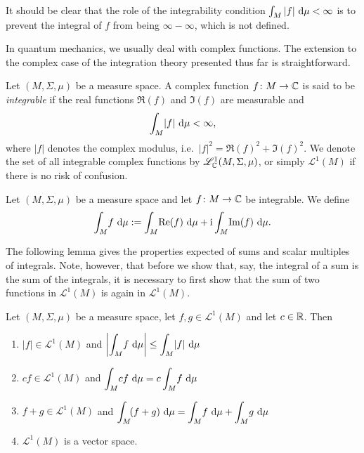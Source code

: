It should be clear that the role of the integrability condition $\int_M |f|\, \mathop{}\!\mathrm{d} \mu<\infty$ is to prevent the integral of $f$ from being $\infty-\infty$, which is not defined.

In quantum mechanics, we usually deal with complex functions. The extension to the complex case of the integration theory presented thus far is straightforward.

\begin{definition}
Let $(M,\Sigma,\mu)$ be a measure space. A complex function $f\colon M\to\mathbb{C}$ is said to be \emph{integrable} if the real functions $\Re(f)$ and $\Im(f)$ are measurable and
\begin{equation*}
\int_{M}\!|f|\,\mathop{}\!\mathrm{d} \mu < \infty,
\end{equation*}
where $|f|$ denotes the complex modulus, i.e.\ $|f|^2=\Re(f)^2+\Im(f)^2$. We denote the set of all integrable complex functions by $\mathscr{L}^1_{\mathbb{C}}(M,\Sigma,\mu)$, or simply $\mathscr{L}^1(M)$ if there is no risk of confusion.
\end{definition}

\begin{definition}
Let $(M,\Sigma,\mu)$ be a measure space and let $f\colon M\to\mathbb{C}$ be integrable. We define
\begin{equation*}
\int_{M}\!f\,\mathop{}\!\mathrm{d} \mu := \int_{M}\!\operatorname{Re}(f)\,\mathop{}\!\mathrm{d} \mu +\mathrm{i}\int_{M}\!\operatorname{Im}(f)\,\mathop{}\!\mathrm{d} \mu .
\end{equation*}
\end{definition}

The following lemma gives the properties expected of sums and scalar
multiples of integrals. Note, however, that before we show that, say,
the integral of a sum is the sum of the integrals, it is necessary to
first show that the sum of two functions in $\mathscr{L}^1(M)$ is
again in $\mathscr{L}^1(M)$.

\begin{lemma}
\label{lem:l1vs}
Let $(M,\Sigma,\mu)$ be a measure space, let $f,g \in \mathscr{L}^1(M)$ and let $c \in \mathbb{R}$. Then
\begin{enumerate}[label=(\roman*)]
\item $|f| \in \mathscr{L}^1(M)$ and $ \displaystyle \biggl| \int_M \! f \, \mathop{}\!\mathrm{d} \mu \biggr| \leq \int_M \! | f| \, \mathop{}\!\mathrm{d} \mu $
\item $c f \in \mathscr{L}^1(M)$ and $ \displaystyle \int_M \! cf \, \mathop{}\!\mathrm{d} \mu = c \int_M \!  f \, \mathop{}\!\mathrm{d} \mu$
\item $f+g \in \mathscr{L}^1(M)$ and $ \displaystyle \int_M \! (f+g) \, \mathop{}\!\mathrm{d} \mu = \int_M \!  f \, \mathop{}\!\mathrm{d} \mu +  \int_M \!  g \, \mathop{}\!\mathrm{d} \mu$
\item $\mathscr{L}^1(M)$ is a vector space.
\end{enumerate}
\end{lemma}

